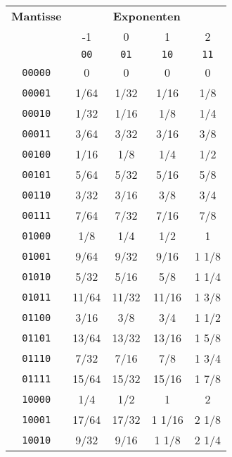 \documentclass[11pt,a4paper]{article}
\begin{document}

\begin{table}[htbp]
  \centering
  \begin{tabular}{|c||cccc|}
  \hline
  	\textbf{Mantisse} & \multicolumn{4}{|c|}{\textbf{Exponenten}} \\
                 & -1    & 0     & 1     & 2 \\
                 & \texttt{00} & \texttt{01} & \texttt{10} & \texttt{11} \\
 \hline \hline
    \texttt{00000} & 0         & 0         & 0         & 0         \\
    \texttt{00001} &    1/64  &    1/32  &    1/16  &    1/8   \\
    \texttt{00010} &    1/32  &    1/16  &    1/8   &    1/4   \\
    \texttt{00011} &    3/64  &    3/32  &    3/16  &    3/8   \\
    \texttt{00100} &    1/16  &    1/8   &    1/4   &    1/2   \\
    \texttt{00101} &    5/64  &    5/32  &    5/16  &    5/8   \\
    \texttt{00110} &    3/32  &    3/16  &    3/8   &    3/4   \\
    \texttt{00111} &    7/64  &    7/32  &    7/16  &    7/8   \\
    \texttt{01000} &    1/8   &    1/4   &    1/2   & 1         \\
    \texttt{01001} &    9/64  &    9/32  &    9/16  & 1   1/8   \\
    \texttt{01010} &    5/32  &    5/16  &    5/8   & 1   1/4   \\
   	\texttt{01011} &   11/64  &   11/32  &   11/16  & 1   3/8   \\
    \texttt{01100} &    3/16  &    3/8   &    3/4   & 1   1/2   \\
    \texttt{01101} &   13/64  &   13/32  &   13/16  & 1   5/8   \\
    \texttt{01110} &    7/32  &    7/16  &    7/8   & 1   3/4   \\
    \texttt{01111} &   15/64  &   15/32  &   15/16  & 1   7/8   \\
    \texttt{10000} &    1/4   &    1/2   & 1         & 2         \\
    \texttt{10001} &   17/64  &   17/32  & 1   1/16  & 2   1/8   \\
    \texttt{10010} &    9/32  &    9/16  & 1   1/8   & 2   1/4   \\

\end{tabular}
\end{table}
\end{document}
